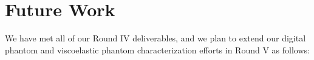 \section{Future Work}\label{sect:future_work}

We have met all of our Round IV deliverables, and we plan to extend our digital
phantom and viscoelastic phantom characterization efforts in Round V as
follows:
